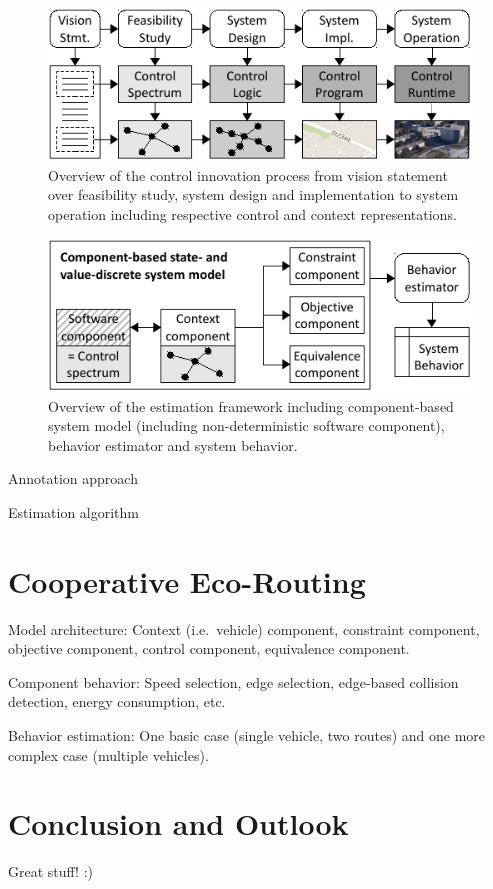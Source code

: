 \documentclass[conference]{../cls/IEEEtran}
\begin{document}
\begin{figure}[b]
	\centering
	\includegraphics{../gfx/process.pdf}
	\caption{Overview of the control innovation process from vision statement over feasibility study, system design and implementation to system operation including respective control and context representations.}
	\label{figure:process}
\end{figure}

\begin{figure}[b]
	\centering
	\includegraphics{../gfx/framework.pdf}
	\caption{Overview of the estimation framework including component-based system model (including non-deterministic software component), behavior estimator and system behavior.}
	\label{figure:framework}
\end{figure}

Annotation approach \cite{Hackenberg2012}

Estimation algorithm

\section{Cooperative Eco-Routing}

Model architecture: Context (i.e.\ vehicle) component, constraint component, objective component, control component, equivalence component.

Component behavior: Speed selection, edge selection, edge-based collision detection, energy consumption, etc.

Behavior estimation: One basic case (single vehicle, two routes) and one more complex case (multiple vehicles).

\section{Conclusion and Outlook}

Great stuff! :)



\end{document}
